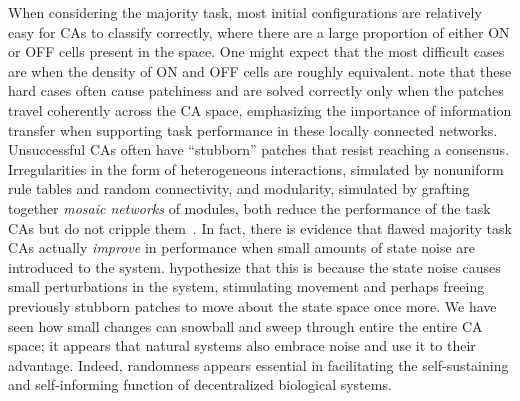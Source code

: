 \documentclass[a4paper,11pt]{article}
\begin{document}
When considering the majority task, most initial configurations are relatively easy for CAs to classify correctly, where there are a large proportion of either ON or OFF cells present in the space. One might expect that the most difficult cases are when the density of ON and OFF cells are roughly equivalent. \citeauthor{me07} note that these hard cases often cause patchiness and are solved correctly only when the patches travel coherently across the CA space, emphasizing the importance of information transfer when supporting task performance in these locally connected networks. Unsuccessful CAs often have ``stubborn'' patches that resist reaching a consensus. Irregularities in the form of heterogeneous interactions, simulated by nonuniform rule tables and random connectivity, and modularity, simulated by grafting together \textit{mosaic networks} of modules, both reduce the performance of the task CAs but do not cripple them~\cite{me07}. In fact, there is evidence that flawed majority task CAs actually \textit{improve} in performance when small amounts of state noise are introduced to the system. \citeauthor{me07} hypothesize that this is because the state noise causes small perturbations in the system, stimulating movement and perhaps freeing previously stubborn patches to move about the state space once more. We have seen how small changes can snowball and sweep through entire the entire CA space; it appears that natural systems also embrace noise and use it to their advantage. Indeed, randomness appears essential in facilitating the self-sustaining and self-informing function of decentralized biological systems.

\end{document}
